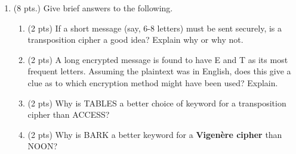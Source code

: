 \documentclass[12pt]{article}
\renewcommand{\emph}[1]{\textsf{\textbf{#1}}}
\begin{document}
\begin{enumerate}
\begin{enumerate}
\begin{enumerate}
 \ 
 
	Number of rows \underline{\hskip1.5in}

\ 

	Number of blank entries in last row \underline{\hskip1.5in}

\ 


		\item (6 pts.) Finish the decryption to recover the plaintext.
	Plaintext: \underline{\hskip2.5in}
		\end{enumerate}
	\end{enumerate}

\newpage
\item (8 pts.)  Give brief answers to the following.

	\begin{enumerate}

	\item (2 pts)
If a short message (say, 6-8 letters) must be sent securely, is a transposition cipher a good idea? Explain why or why not.

\vfill


	\item (2 pts) A long encrypted message is found to have E and T as its most frequent letters. Assuming the plaintext was in English, does this give a clue as to which encryption method might have been used? Explain.

\vfill

	\item (2 pts)  Why is \textsf{TABLES} a better choice of keyword for a transposition cipher than \textsf{ACCESS}?

\vfill
	\item (2 pts) Why is {\textsf BARK} a better keyword for a 
\emph{Vigen\`ere cipher} than {\textsf NOON}?

\vfill
\end{enumerate}


\end{enumerate}
\end{document}
